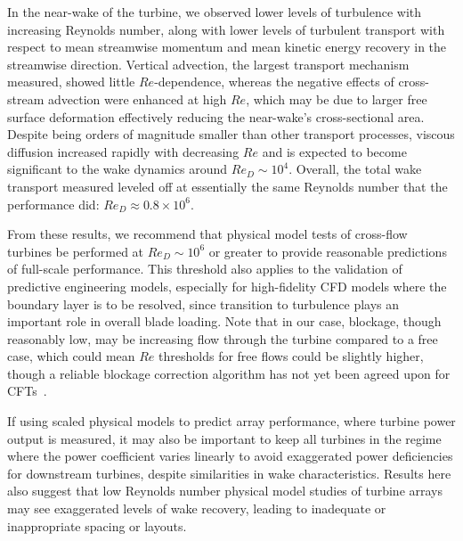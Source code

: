 \documentclass[energies,article,accept,moreauthors,pdftex,10pt,a4paper]{mdpi}
\theoremstyle{mdpi}
\newcounter{thm}
\newcounter{ex}
\newcounter{re}
\begin{document}
In the near-wake of the turbine, we observed lower levels of turbulence with
increasing Reynolds number, along with lower levels of turbulent transport with
respect to mean streamwise momentum and mean kinetic energy recovery in the
streamwise direction. Vertical advection, the largest transport mechanism
measured, showed little $Re$-dependence, whereas the negative effects of
cross-stream advection were enhanced at high $Re$, which may be due to larger
free surface deformation effectively reducing the near-wake's cross-sectional
area. Despite being orders of magnitude smaller than other transport processes,
viscous diffusion increased rapidly with decreasing $Re$ and is expected to
become significant to the wake dynamics around $Re_D \sim 10^4$. Overall, the
total wake transport measured leveled off at essentially the same Reynolds
number that the performance did: $Re_D \approx 0.8 \times 10^6$.

From these results, we recommend that physical model tests of cross-flow
turbines be performed at $Re_D \sim 10^6$ or greater to provide reasonable
predictions of full-scale performance. This threshold also applies to the
validation of predictive engineering models, especially for high-fidelity CFD
models where the boundary layer is to be resolved, since transition to
turbulence plays an important role in overall blade loading. Note that in our
case, blockage, though reasonably low, may be increasing flow through the
turbine compared to a free case, which could mean $Re$ thresholds for free flows
could be slightly higher, though a reliable blockage correction algorithm has
not yet been agreed upon for CFTs~\cite{Cavagnaro2014}.

If using scaled physical models to predict array performance, where turbine
power output is measured, it may also be important to keep all turbines in the
regime where the power coefficient varies linearly to avoid exaggerated power
deficiencies for downstream turbines, despite similarities in wake
characteristics. Results here also suggest that low Reynolds number physical
model studies of turbine arrays may see exaggerated levels of wake recovery,
leading to inadequate or inappropriate spacing or layouts.


\vspace{6pt} 
\end{document}
